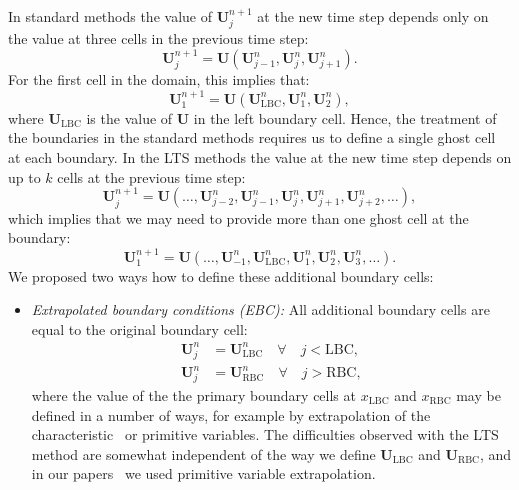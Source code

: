 {In standard methods the value of $ \mathbf{U}_j^{n+1} $ at the new time step depends only on the value at three cells in the previous time step:
\begin{equation}
\mathbf{U}_j^{n+1} = \mathbf{U} \left( \mathbf{U}_{j-1}^n, \mathbf{U}_j^n, \mathbf{U}_{j+1}^n \right).
\end{equation}
For the first cell in the domain, this implies that:
\begin{equation}
\mathbf{U}_1^{n+1} = \mathbf{U} \left( \mathbf{U}_{\text{LBC}}^n, \mathbf{U}_1^n, \mathbf{U}_{2}^n \right),
\end{equation}
where $ \mathbf{U}_{\text{LBC}} $ is the value of $ \mathbf{U} $ in the left boundary cell. Hence, the treatment of the boundaries in the standard methods requires us to define a single ghost cell at each boundary. In the LTS methods the value at the new time step depends on up to $ k $ cells at the previous time step:
\begin{equation}
\mathbf{U}_j^{n+1} = \mathbf{U} \left( \dots, \mathbf{U}_{j-2}^n, \mathbf{U}_{j-1}^n, \mathbf{U}_j^n, \mathbf{U}_{j+1}^n, \mathbf{U}_{j+2}^n, \dots \right),
\end{equation}
which implies that we may need to provide more than one ghost cell at the boundary:
\begin{equation}
\mathbf{U}_1^{n+1} = \mathbf{U} \left( \dots, \mathbf{U}_{-1}^n, \mathbf{U}_{\text{LBC}}^n, \mathbf{U}_1^n, \mathbf{U}_{2}^n, \mathbf{U}_{3}^n, \dots \right).
\end{equation}
We proposed two ways how to define these additional boundary cells:
\begin{itemize}
\item \textit{Extrapolated boundary conditions (EBC):} All additional boundary cells are equal to the original boundary cell:
\begin{subequations} \label{eq:EBC}
\begin{align}
\mathbf{U}_j^n & = \mathbf{U}_{\text{LBC}}^n \quad \forall \quad j < \text{LBC}, \label{eq:EBCL} \\
\mathbf{U}_j^n & = \mathbf{U}_{\text{RBC}}^n \quad \forall \quad j > \text{RBC}, \label{eq:EBCR}
\end{align}
\end{subequations}
where the value of the the primary boundary cells at $ x_\text{LBC} $ and $ x_\text{RBC} $ may be defined in a number of ways, for example by extrapolation of the characteristic~\cite{fje02} or primitive variables. The difficulties observed with the LTS method are somewhat independent of the way we define $ \mathbf{U}_\text{LBC} $ and $ \mathbf{U}_\text{RBC} $, and in our papers~\cite{jp1,cp1} we used primitive variable extrapolation.

\end{itemize}}
